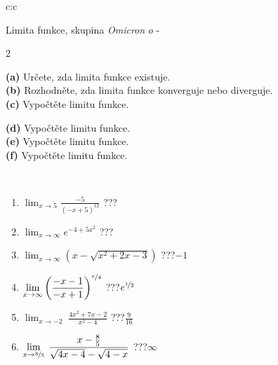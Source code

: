 \documentclass[10pt]{report}
\newcommand\omicron{o}
\begin{document}
\newpage
\thispagestyle{empty}
\begin{tabular}{c:c}
\begin{minipage}[c][104.5mm][t]{0.5\linewidth}
\begin{center}
\vspace{7mm}
{\huge Limita funkce, skupina \textit{Omicron $\omicron$} -}\\[5mm]
\begin{minipage}{0.95\linewidth}
\begin{center}
{\small \begin{multicols}{2} \raggedright
\textbf{(a)} Určete, zda limita funkce existuje. \\[1mm]
\textbf{(b)} Rozhodněte, zda limita funkce konverguje nebo diverguje. \\[1mm]
\textbf{(c)} Vypočtěte limitu funkce. \par \columnbreak
\textbf{(d)} Vypočtěte limitu funkce. \\[1mm]
\textbf{(e)} Vypočtěte limitu funkce. \\[1mm]
\textbf{(f)} Vypočtěte limitu funkce. \\[1mm]
\end{multicols}
}
\end{center}
\end{minipage}
\\[4mm]
\begin{minipage}{0.79\linewidth}
\begin{center}
\begin{varwidth}{\linewidth}
\begin{enumerate}
\normalsize
\item $\displaystyle\lim_{x\to5}{\frac{-5}{(-x+5)^{12}}}$\quad \dotfill\; ???\;\dotfill \quad {}
\item $\displaystyle\lim_{x\to\infty}{e^{-4+5x^2}}$\quad \dotfill\; ???\;\dotfill \quad {}
\item $\displaystyle\lim_{x\to\infty}{\left(x - \sqrt{x^2+2x-3}\right)}$\quad \dotfill\; ???\;\dotfill \quad $-1$
\item $\displaystyle\lim_{x\to\infty}{\left( \frac{-x-1}{-x+1} \right)^{\nicefrac{x}{4}}}$\quad \dotfill\; ???\;\dotfill \quad $e^{\nicefrac{1}{2}}$
\item $\displaystyle\lim_{x\to -2}{\;\frac{4x^2+7x-2}{x^2-4}}$\quad \dotfill\; ???\;\dotfill \quad $\frac{9}{16}$
\item $\displaystyle\lim_{x\to \nicefrac{8}{5}}{\;\frac{x-\frac{8}{5}}{\sqrt{4x-4} - \sqrt{4-x}}}$\quad \dotfill\; ???\;\dotfill \quad $\infty$

\end{enumerate}
\end{varwidth}
\end{center}
\end{minipage}
\end{center}
\end{minipage}
\end{tabular}
\end{document}
